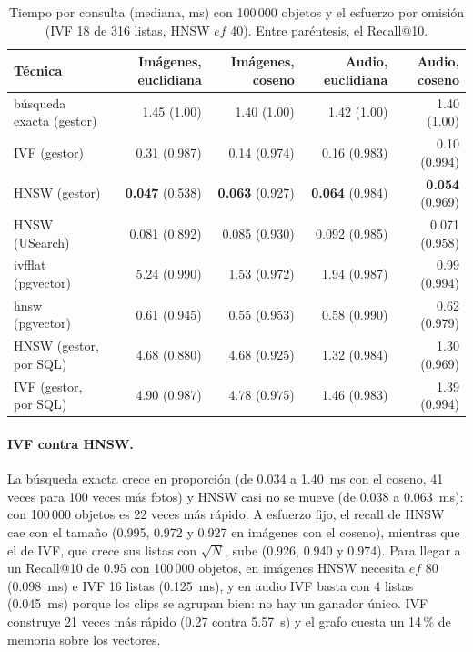 \begin{table}[!htb]
\centering
\caption{Tiempo por consulta (mediana, ms) con 100\,000 objetos y el esfuerzo por omisión
(IVF 18 de 316 listas, HNSW $ef$ 40). Entre paréntesis, el Recall@10.}\label{tab:multimedia-consulta}
\small
\begin{tabular}{@{}lrrrr@{}}
\toprule
\textbf{Técnica} & \textbf{Imágenes, euclidiana} & \textbf{Imágenes, coseno} & \textbf{Audio, euclidiana} & \textbf{Audio, coseno} \\
\midrule
búsqueda exacta (gestor) & 1.45 (1.00) & 1.40 (1.00) & 1.42 (1.00) & 1.40 (1.00) \\
IVF (gestor) & 0.31 (0.987) & 0.14 (0.974) & 0.16 (0.983) & 0.10 (0.994) \\
HNSW (gestor) & \textbf{0.047} (0.538) & \textbf{0.063} (0.927) & \textbf{0.064} (0.984) & \textbf{0.054} (0.969) \\
HNSW (USearch) & 0.081 (0.892) & 0.085 (0.930) & 0.092 (0.985) & 0.071 (0.958) \\
ivfflat (pgvector) & 5.24 (0.990) & 1.53 (0.972) & 1.94 (0.987) & 0.99 (0.994) \\
hnsw (pgvector) & 0.61 (0.945) & 0.55 (0.953) & 0.58 (0.990) & 0.62 (0.979) \\
HNSW (gestor, por SQL) & 4.68 (0.880) & 4.68 (0.925) & 1.32 (0.984) & 1.30 (0.969) \\
IVF (gestor, por SQL) & 4.90 (0.987) & 4.78 (0.975) & 1.46 (0.983) & 1.39 (0.994) \\
\bottomrule
\end{tabular}
\end{table}

\paragraph{IVF contra HNSW.} La búsqueda exacta crece en proporción (de 0.034 a 1.40~ms con
el coseno, 41 veces para 100 veces más fotos) y HNSW casi no se mueve (de 0.038 a
0.063~ms): con 100\,000 objetos es 22 veces más rápido. A esfuerzo fijo, el recall de HNSW cae con el tamaño (0.995, 0.972 y 0.927
en imágenes con el coseno), mientras que el de IVF, que crece sus listas con $\sqrt{N}$,
sube (0.926, 0.940 y 0.974). Para llegar a un Recall@10 de 0.95 con 100\,000 objetos, en
imágenes HNSW necesita $ef$ 80 (0.098~ms) e IVF 16 listas (0.125~ms), y en audio IVF basta
con 4 listas (0.045~ms) porque los clips se agrupan bien: no hay un ganador único. IVF
construye 21 veces más rápido (0.27 contra 5.57~s) y el grafo cuesta un 14\,\% de memoria
sobre los vectores.

